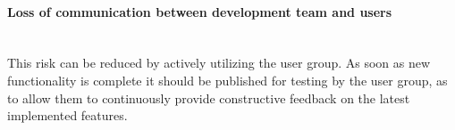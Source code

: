 \paragraph{Loss of communication between development team and users}~\\
This risk can be reduced by actively utilizing the user group. As soon as new functionality is complete it should be published for testing by the user group, as to allow them to continuously provide constructive feedback on the latest implemented features.
